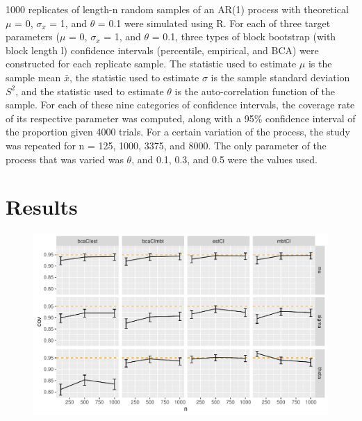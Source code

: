 \documentclass[12pt, letterpaper, titlepage]{article}
\begin{document}
1000 replicates of length-n random samples of an AR(1) process with theoretical $\mu$ = 0, $\sigma_{x}$ = 1, and $\theta$ = 0.1 were simulated using R. For each of three target parameters ($\mu$ = 0, $\sigma_{x}$ = 1, and $\theta$ = 0.1, three types of block bootstrap (with block length l) confidence intervals (percentile, empirical, and BCA) were constructed for each replicate sample. The statistic used to estimate $\mu$ is the sample mean $\bar{x}$, the statistic used to estimate $\sigma$ is the sample standard deviation $S^2$, and the statistic used to estimate $\theta$ is the auto-correlation function of the sample. For each of these nine categories of confidence intervals, the coverage rate of its respective parameter was computed, along with a 95\% confidence interval of the proportion given 4000 trials. For a certain variation of the process, the study was repeated for n = 125, 1000, 3375, and 8000. The only parameter of the process that was varied was $\theta$, and 0.1, 0.3, and 0.5 were the values used.



 

\section{Results}
\label{sec:results}





\begin{figure}[tbp]
\caption{}
  \centering
  \includegraphics[width=\textwidth]{figures/plot_.1}
  \caption{}
  \label{fig:plot_.1}
\end{figure}
\end{document}
